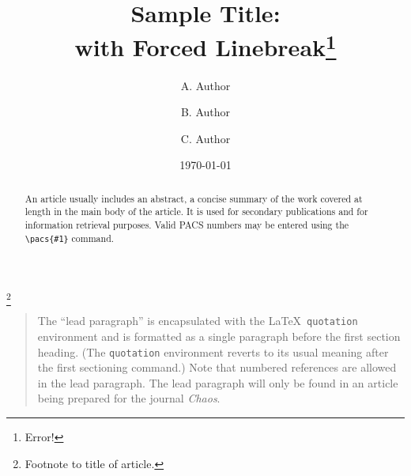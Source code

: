 \documentclass[%
 aip,
 jmp,%
 amsmath,amssymb,
 reprint,%
]{revtex4-1}
\begin{document}

\title[Sample title]{Sample Title:\\with Forced Linebreak\footnote{Error!}}%
\thanks{Footnote to title of article.}

\author{A. Author}
\author{B. Author}%
%

\author{C. Author}
%

\date{\today}%

\begin{abstract}
An article usually includes an abstract, a concise summary of the work
covered at length in the main body of the article. It is used for
secondary publications and for information retrieval purposes. 
%
Valid PACS numbers may be entered using the \verb+\pacs{#1}+ command.
\end{abstract}

\maketitle

\begin{quotation}
The ``lead paragraph'' is encapsulated with the \LaTeX\ 
\verb+quotation+ environment and is formatted as a single paragraph before the first section heading. 
(The \verb+quotation+ environment reverts to its usual meaning after the first sectioning command.) 
Note that numbered references are allowed in the lead paragraph.
%
The lead paragraph will only be found in an article being prepared for the journal \textit{Chaos}.
\end{quotation}
\end{document}
